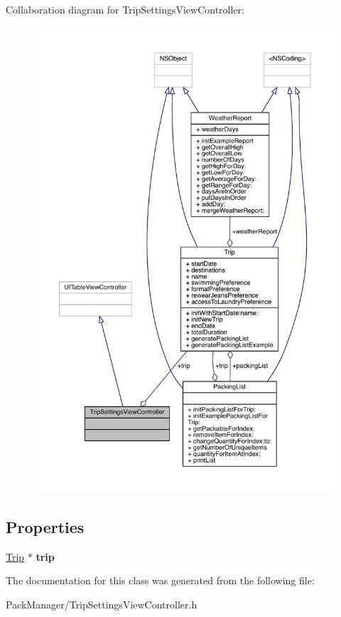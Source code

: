 Collaboration diagram for Trip\-Settings\-View\-Controller\-:
\nopagebreak
\begin{figure}[H]
\begin{center}
\leavevmode
\includegraphics[width=350pt]{interface_trip_settings_view_controller__coll__graph}
\end{center}
\end{figure}
\subsection*{Properties}
\begin{DoxyCompactItemize}
\item 
\hypertarget{interface_trip_settings_view_controller_a2faba5a7d0de3f72b88a18801c2b0be4}{\hyperlink{interface_trip}{Trip} $\ast$ {\bfseries trip}}\label{interface_trip_settings_view_controller_a2faba5a7d0de3f72b88a18801c2b0be4}

\end{DoxyCompactItemize}


The documentation for this class was generated from the following file\-:\begin{DoxyCompactItemize}
\item 
Pack\-Manager/Trip\-Settings\-View\-Controller.\-h\end{DoxyCompactItemize}
